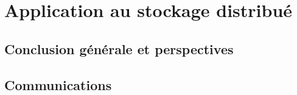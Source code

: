 
%

\part{Application au stockage distribué}


%


%


%


%


%

\chapter{Conclusion générale et perspectives}



%

\endrefsegment

\chapter*{Communications}



%

\printbibliography[
    heading=bibintoc,
    segment=1
]




\backmatter


